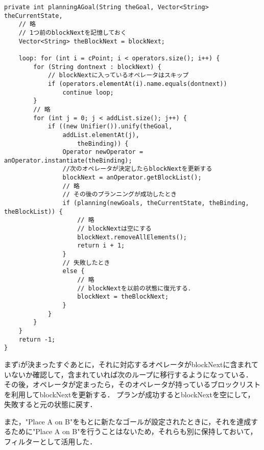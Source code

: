 \documentclass{jarticle}
\begin{document}
\begin{lstlisting}[caption=特定のオペレータが続かないようにする,label=src:blockNext]
private int planningAGoal(String theGoal, Vector<String> theCurrentState,
    // 略
    // 1つ前のblockNextを記憶しておく
    Vector<String> theBlockNext = blockNext;
    
    loop: for (int i = cPoint; i < operators.size(); i++) {
        for (String dontnext : blockNext) {
            // blockNextに入っているオペレータはスキップ
            if (operators.elementAt(i).name.equals(dontnext))
                continue loop;
        }
        // 略
        for (int j = 0; j < addList.size(); j++) {
            if ((new Unifier()).unify(theGoal,
                addList.elementAt(j),
                    theBinding)) {
                Operator newOperator = anOperator.instantiate(theBinding);
                //次のオペレータが決定したらblockNextを更新する
                blockNext = anOperator.getBlockList();
                // 略
                // その後のプランニングが成功したとき
                if (planning(newGoals, theCurrentState, theBinding, theBlockList)) {
                    // 略
                    // blockNextは空にする
                    blockNext.removeAllElements();
                    return i + 1;
                }
                // 失敗したとき
                else {
                    // 略
                    // blockNextを以前の状態に復元する．
                    blockNext = theBlockNext;
                }
            }
        }
    }
    return -1;
}
\end{lstlisting}

まずiが決まったすぐあとに，それに対応するオペレータがblockNextに含まれていないか確認して，含まれていれば次のループに移行するようになっている．
その後，オペレータが定まったら，そのオペレータが持っているブロックリストを利用してblockNextを更新する．
プランが成功するとblockNextを空にして，失敗すると元の状態に戻す．
\newline

また，"Place A on B"をもとに新たなゴールが設定されたときに，それを達成するために"Place A on B"を行うことはないため，それらも別に保持しておいて，フィルターとして活用した．
\end{document}
